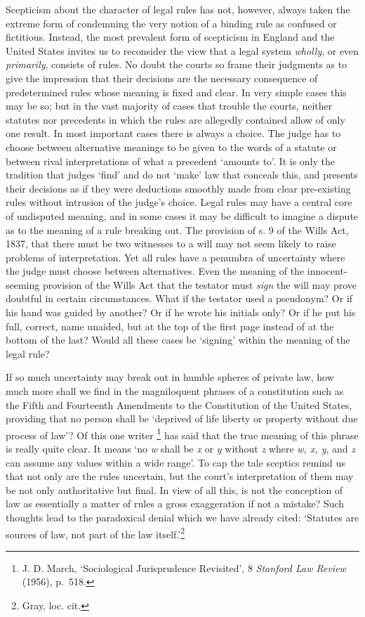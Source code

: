 Scepticism about the character of legal rules has not, however, always
taken the extreme form of condemning the very notion of a binding rule
as confused or fictitious. Instead, the most prevalent form of
scepticism in England and the United States invites us to reconsider the
view that a legal system \emph{wholly}, or even \emph{primarily},
consists of rules. No doubt the courts so frame their judgments as to
give the impression that their decisions are the necessary consequence
of predetermined rules whose meaning is fixed and clear. In very simple
cases this may be so; but in the vast majority of cases that trouble the
courts, neither statutes nor precedents in which the rules are allegedly
contained allow of only one result. In most important cases there is
always a choice. The judge has to choose between alternative meanings to
be given to the words of a statute or between rival interpretations of
what a precedent `amounts to'. It is only the tradition that judges
`find' and do not `make' law that conceals this, and presents their
decisions as if they were deductions smoothly made from clear
pre-existing rules without intrusion of the judge's choice. Legal rules
may have a central core of undisputed meaning, and in some cases it may
be difficult to imagine a dispute as to the meaning of a rule breaking
out. The provision of s. 9 of the Wills Act, 1837, that there must be
two witnesses to a will may not seem likely to raise problems of
interpretation. Yet all rules have a penumbra of uncertainty where the
judge must choose between alternatives. Even the meaning of the
innocent-seeming provision of the Wills Act that the testator must
\emph{sign} the will may prove doubtful in certain circumstances. What
if the testator used a pseudonym? Or if his hand was guided by another?
Or if he wrote his initials only? Or if he put his full, correct, name
unaided, but at the top of the first page instead of at the bottom of
the last? Would all these cases be `signing' within the meaning of the
legal rule?

If so much uncertainty may break out in humble spheres of private law,
how much more shall we find in the magniloquent phrases of a
constitution such as the Fifth and Fourteenth Amendments to the
Constitution of the United States, providing that no person shall be
`deprived of life liberty or property without due process of law'? Of
this one writer \footnote{J. D. March, `Sociological Jurisprudence
  Revisited', 8 \emph{Stanford Law Review} (1956), p.~518.} has said
that the true meaning of this phrase is really quite clear. It means `no
\emph{w} shall be \emph{x} or \emph{y} without \emph{z} where \emph{w,
x, y}, and \emph{z} can assume any values within a wide range'. To cap
the tale sceptics remind us that not only are the rules uncertain, but
the court's interpretation of them may be not only authoritative but
final. In view of all this, is not the conception of law as essentially
a matter of rules a gross exaggeration if not a mistake? Such thoughts
lead to the paradoxical denial which we have already cited: `Statutes
are sources of law, not part of the law itself.'\footnote{Gray, loc.
  cit.}

